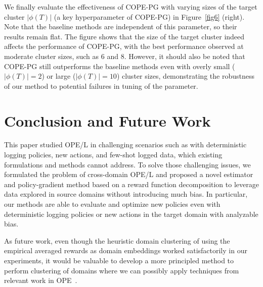 \documentclass{article} %
\theoremstyle{definition}
\begin{document}
We finally evaluate the effectiveness of COPE-PG with varying sizes of the target cluster $|\phi(T)|$ (a key hyperparameter of COPE-PG) in Figure~\ref{fig6} (right). Note that the baseline methods are independent of this parameter, so their results remain flat. The figure shows that the size of the target cluster indeed affects the performance of COPE-PG, with the best performance observed at moderate cluster sizes, such as 6 and 8. However, it should also be noted that COPE-PG still outperforms the baseline methods even with overly small ($|\phi(T)| = 2$) or large ($|\phi(T)| = 10$) cluster sizes, demonstrating the robustness of our method to potential failures in tuning of the parameter.


\section{Conclusion and Future Work}
This paper studied OPE/L in challenging scenarios such as with deterministic logging policies, new actions, and few-shot logged data, which existing formulations and methods cannot address. To solve those challenging issues, we formulated the problem of cross-domain OPE/L and proposed a novel estimator and policy-gradient method based on a reward function decomposition to leverage data explored in source domains without introducing much bias. In particular, our methods are able to evaluate and optimize new policies even with deterministic logging policies or new actions in the target domain with analyzable bias.

As future work, even though the heuristic domain clustering of using the empirical averaged rewards as domain embeddings worked satisfactorily in our experiments, it would be valuable to develop a more principled method to perform clustering of domains where we can possibly apply techniques from relevant work in OPE~\citep{peng2023offline,sachdeva2024off,kiyohara2024off}.
\end{document}
